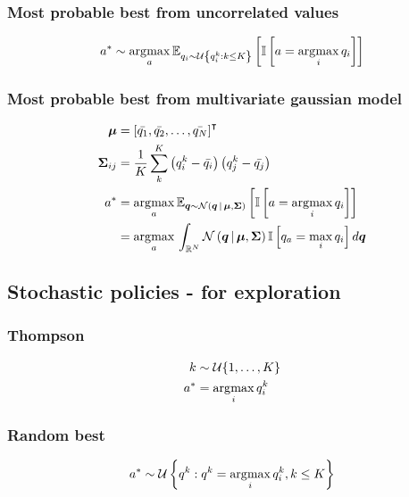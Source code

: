 \documentclass[10pt]{article}
\begin{document}
\subsubsection{Most probable best from uncorrelated values}
\begin{equation}
	a^* \sim \argmax{a} \expected[q_i \sim \mathcal{U}\left\lbrace q^k_i : k \le K \right\rbrace]{\iverson{ a = \argmax{i}{q_i}}}
\end{equation}

\subsubsection{Most probable best from multivariate gaussian model}
\begin{align}
	\tensor{\mu}         & = \trans{\left[ \bar{q_1}, \bar{q_2}, \ldots, \bar{q_N} \right]}                                     \\
	\tensor{\Sigma}_{ij} & = \frac{1}{K}\sum_{k}^{K}\left(q^k_i -\bar{q_i}\right) \left( q^k_j -\bar{q_j}\right)                \\
	a^*                  & = \argmax{a}
	\expected[{\tensor{q} \sim \func[\mathcal{N}]{\tensor{q} \cond \tensor{\mu}, \tensor{\Sigma} }}]{%
		\iverson{a = \argmax{i} q_i}}                                                                                               \\
	                     & = \argmax{a} \int_{\mathbb{R}^N} \func[\mathcal{N}]{\tensor{q} \cond \tensor{\mu}, \tensor{\Sigma} }
	\iverson{q_a = \max_{i} q_i} d\tensor{q}
\end{align}

\subsection{Stochastic policies - for exploration}

\subsubsection{Thompson}
\begin{align*}
	k & \sim \mathcal{U}\lbrace 1, \ldots, K \rbrace \\ a^* &= \argmax{i} q^k_i
\end{align*}

\subsubsection{Random best}
\begin{align*}
	a^* \sim \mathcal{U}\left\lbrace q^k : q^k = \argmax{i} q^k_i, k \le K \right\rbrace
\end{align*}
\end{document}
